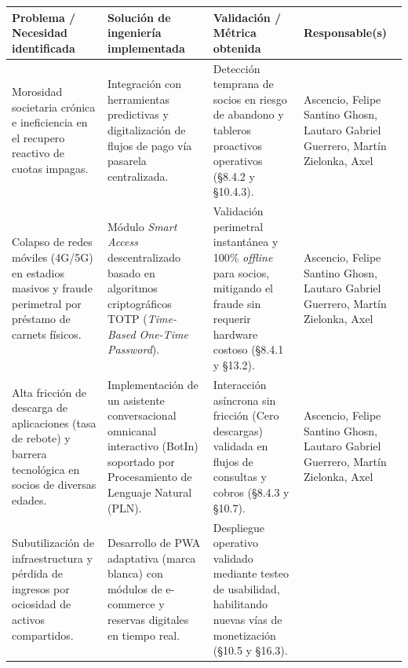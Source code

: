 \documentclass{estilo}
\begin{document}
\noindent
\renewcommand{\arraystretch}{1.4}
\begin{tabularx}{\textwidth}{|>{\raggedright\arraybackslash}p{3.5cm}|>{\raggedright\arraybackslash}X|>{\raggedright\arraybackslash}p{3.5cm}|>{\raggedright\arraybackslash}p{3cm}|}
\hline
\rowcolor[gray]{0.9}\textbf{Problema / Necesidad identificada} & \textbf{Solución de ingeniería implementada} & \textbf{Validación / Métrica obtenida} & \textbf{Responsable(s)} \\
\hline
Morosidad societaria crónica e ineficiencia en el recupero reactivo de cuotas impagas. & 
Integración con herramientas predictivas y digitalización de flujos de pago vía pasarela centralizada. & 
Detección temprana de socios en riesgo de abandono y tableros proactivos operativos (\S 8.4.2 y \S 10.4.3). & 
Ascencio, Felipe Santino \newline Ghosn, Lautaro Gabriel \newline Guerrero, Martín \newline Zielonka, Axel \\
\hline
Colapso de redes móviles (4G/5G) en estadios masivos y fraude perimetral por préstamo de carnets físicos. & 
Módulo \textit{Smart Access} descentralizado basado en algoritmos criptográficos TOTP (\textit{Time-Based One-Time Password}). & 
Validación perimetral instantánea y 100\% \textit{offline} para socios, mitigando el fraude sin requerir hardware costoso (\S 8.4.1 y \S 13.2). & 
Ascencio, Felipe Santino \newline Ghosn, Lautaro Gabriel \newline Guerrero, Martín \newline Zielonka, Axel \\
\hline
Alta fricción de descarga de aplicaciones (tasa de rebote) y barrera tecnológica en socios de diversas edades. & 
Implementación de un asistente conversacional omnicanal interactivo (BotIn) soportado por Procesamiento de Lenguaje Natural (PLN). & 
Interacción asíncrona sin fricción (Cero descargas) validada en flujos de consultas y cobros (\S 8.4.3 y \S 10.7). & 
Ascencio, Felipe Santino \newline Ghosn, Lautaro Gabriel \newline Guerrero, Martín \newline Zielonka, Axel \\
\hline
Subutilización de infraestructura y pérdida de ingresos por ociosidad de activos compartidos. & 
Desarrollo de PWA adaptativa (marca blanca) con módulos de e-commerce y reservas digitales en tiempo real. & 
Despliegue operativo validado mediante testeo de usabilidad, habilitando nuevas vías de monetización (\S 10.5 y \S 16.3). & 

\end{tabularx}
\end{document}
